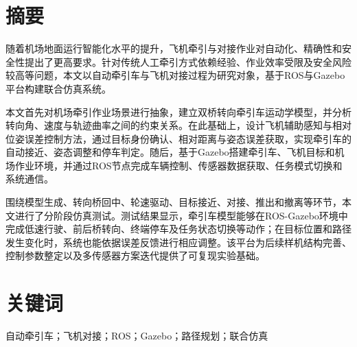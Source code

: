
\section*{摘\qquad 要}

随着机场地面运行智能化水平的提升，飞机牵引与对接作业对自动化、精确性和安全性提出了更高要求。针对传统人工牵引方式依赖经验、作业效率受限及安全风险较高等问题，本文以自动牵引车与飞机对接过程为研究对象，基于ROS与Gazebo平台构建联合仿真系统。

本文首先对机场牵引作业场景进行抽象，建立双桥转向牵引车运动学模型，并分析转向角、速度与轨迹曲率之间的约束关系。在此基础上，设计飞机辅助感知与相对位姿误差控制方法，通过目标身份确认、相对距离与姿态误差获取，实现牵引车的自动接近、姿态调整和停车判定。随后，基于Gazebo搭建牵引车、飞机目标和机场作业环境，并通过ROS节点完成车辆控制、传感器数据获取、任务模式切换和系统通信。

围绕模型生成、转向桥回中、轮速驱动、目标接近、对接、推出和撤离等环节，本文进行了分阶段仿真测试。测试结果显示，牵引车模型能够在ROS-Gazebo环境中完成低速行驶、前后桥转向、终端停车及任务状态切换等动作；在目标位置和路径发生变化时，系统也能依据误差反馈进行相应调整。该平台为后续样机结构完善、控制参数整定以及多传感器方案迭代提供了可复现实验基础。

\section*{关键词}
自动牵引车；飞机对接；ROS；Gazebo；路径规划；联合仿真

